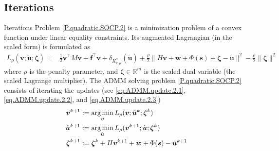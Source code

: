 \documentclass[8pt,red]{beamer}
\theoremstyle{plain}
\theoremstyle{definition}
\theoremstyle{remark}
\newcommand{\argmin}{\operatornamewithlimits{\mathrm{arg\,min}}}
\renewcommand{\Re}{\ensuremath{\mathbb{R}}}
\newcommand{\bi}[1]{\ensuremath{\boldsymbol{#1}}}
\begin{document}
\subsection{Iterations}
\begin{frame}{Iterations}
Problem \eqref{P.quadratic.SOCP.2} is a minimization problem of a convex 
function under linear equality constraints. 
Its augmented Lagrangian (in the scaled form) is formulated as 
\begin{align}
  L_{\rho}(\bi{v};\tilde{\bi{u}};\bi{\zeta}) 
  =& \frac{1}{2} \bi{v}^{\top} M \bi{v} + \bi{f}^{\top} \bi{v} 
  +  \delta_{K_{e,\mu}^{*}}(\tilde{\bi{u}}) +  \frac{\rho}{2} 
  \| H \bi{v} + \bi{w} + \Phi(\bi{s}) + \bi{\zeta}  - \tilde{\bi{u}} \|^{2}
    - \frac{\rho}{2} \| \bi{\zeta}\|^{2} 
    \label{eq.ADMM.friction.AugLagrange}
\end{align}
where $\rho$ is the penalty parameter, and $\bi{\zeta} \in \Re^{m}$ is  the scaled dual variable (the scaled Lagrange multiplier). 
The ADMM solving problem \eqref{P.quadratic.SOCP.2} consists of 
iterating the updates (see \eqref{eq.ADMM.update.2.1}, 
\eqref{eq.ADMM.update.2.2}, and \eqref{eq.ADMM.update.2.3}) 
\begin{align}
  \bi{v}^{k+1} 
  &:= \argmin_{\bi{v}} 
  L_{\rho}(\bi{v};\tilde{\bi{u}}^{k};\bi{\zeta}^{k})  
  \label{eq.ADMM.friction.1.1} \\
  \tilde{\bi {u}}^{k+1}
  &:= \argmin_{\tilde{\bi{u}}} 
    L_{\rho}(\bi{v}^{k+1};\tilde{\bi{u}};\bi{\zeta}^{k}) 
    \label{eq.ADMM.friction.1.2} \\
  \bi{\zeta}^{k+1} &:= \bi{\zeta}^{k} 
  + 
  H \bi{v}^{k+1} +\bi{w} +\Phi(\bi{s}) - \tilde{\bi{u}}^{k+1}  
  \label{eq.ADMM.friction.1.3}
\end{align}

\end{frame}
\end{document}
